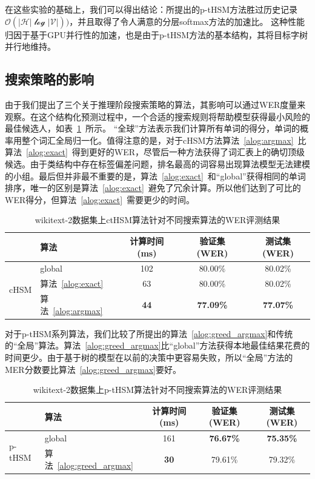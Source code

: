 在这些实验的基础上，我们可以得出结论：所提出的p-tHSM方法胜过历史记录$ \mathcal{O(| H | \log| V |)})$，并且取得了令人满意的分层softmax方法的加速比。 这种性能归因于基于GPU并行性的加速，也是由于p-tHSM方法的基本结构，其将目标字树并行地维持。



\subsection{搜索策略的影响}
由于我们提出了三个关于推理阶段搜索策略的算法，其影响可以通过WER度量来观察。在这个结构化预测过程中，一个合适的搜索规则将帮助模型获得最小风险的最佳候选人，如表~\ref{tab:search}~所示。 “全球”方法表示我们计算所有单词的得分，单词的概率用整个词汇全局归一化。值得注意的是，对于cHSM方法算法~\ref{alog:argmax}~比算法~\ref{alog:exact}~得到更好的WER，尽管后一种方法获得了词汇表上的确切顶级候选。由于类结构中存在标签偏差问题，排名最高的词容易出现算法模型无法建模的小组。最后但并非最不重要的是，算法~\ref{alog:exact}~和``global''获得相同的单词排序，唯一的区别是算法~\ref{alog:exact}~避免了冗余计算。所以他们达到了可比的WER得分，但算法~\ref{alog:exact}~需要更少的时间。
\begin{table}[!ht]
  \centering
  \caption{wikitext-2数据集上ctHSM算法针对不同搜索算法的WER评测结果\label{tab:search}}
\begin{tabular}{llccc}
  \toprule
   & 算法&计算时间 (ms)&验证集 (WER)& 测试集(WER)\\ \midrule
  \multirow{3}{*}{cHSM} &global&102& 80.00\%& 80.02\%\\
        &算法~\ref{alog:exact}&63& 80.00\%& 80.02\%\\
        &算法~\ref{alog:argmax}&\textbf{44}&\textbf{ 77.09\%}&\textbf{ 77.07\%}\\
  \bottomrule
\end{tabular}
\end{table}


对于p-tHSM系列算法，我们比较了所提出的算法~\ref{alog:greed_argmax}和传统的“全局”算法。算法~\ref{alog:greed_argmax}比“global”方法获得本地最佳结果花费的时间更少。由于基于树的模型在以前的决策中更容易失败，所以“全局”方法的MER分数要比算法~\ref{alog:greed_argmax}要好。
\begin{table}[!ht]
  \centering
  \caption{wikitext-2数据集上p-tHSM算法针对不同搜索算法的WER评测结果\label{tab:psearch2}}
\begin{tabular}{llccc}
  \toprule
        & 算法&计算时间 (ms)&验证集 (WER)& 测试集(WER)\\ \midrule
  \multirow{2}{*}{p-tHSM}  &global&161& \textbf{76.67\%}&\textbf{75.35\%}\\
        &算法~\ref{alog:greed_argmax}&\textbf{30} & 79.61\%&79.32\%\\
  \bottomrule
\end{tabular}
\end{table}


